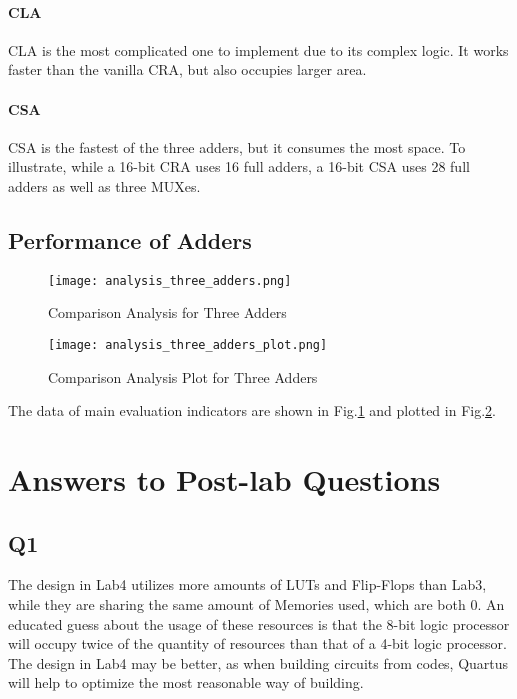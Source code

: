 \documentclass[11pt]{article}
\begin{document}
\paragraph{CLA} CLA is the most complicated one to implement due to its complex logic. It works faster than the vanilla CRA, but also occupies larger area.
\paragraph{CSA} CSA is the fastest of the three adders, but it consumes the most space. To illustrate, while a 16-bit CRA uses 16 full adders, a 16-bit CSA uses 28 full adders as well as three MUXes.

\subsection{Performance of Adders}
\begin{figure}[h]
    \centering
    \texttt{[image: analysis\_three\_adders.png]}
    \caption{Comparison Analysis for Three Adders}
    \label{analysis_three_adders}
\end{figure}

\begin{figure}[h]
    \centering
    \texttt{[image: analysis\_three\_adders\_plot.png]}
    \caption{Comparison Analysis Plot for Three Adders}
    \label{analysis_three_adders_plot}
\end{figure}

The data of main evaluation indicators are shown in Fig.\ref{analysis_three_adders} and plotted in Fig.\ref{analysis_three_adders_plot}.

\section{Answers to Post-lab Questions}
\subsection{Q1}
The design in Lab4 utilizes more amounts of LUTs and Flip-Flops than Lab3, while they are sharing the same amount of Memories used, which are both 0. An educated guess about the usage of these resources is that the 8-bit logic processor will occupy twice of the quantity of resources than that of a 4-bit logic processor. The design in Lab4 may be better, as when building circuits from codes, Quartus will help to optimize the most reasonable way of building.
\end{document}
